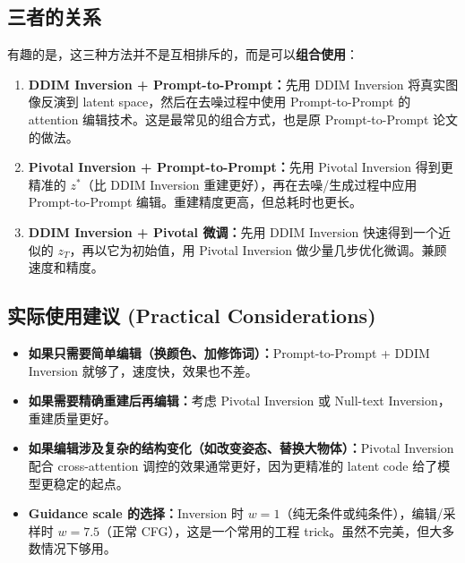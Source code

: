 \documentclass[11pt,a4paper]{article}
\theoremstyle{definition}
\begin{document}
\subsection{三者的关系}

有趣的是，这三种方法并不是互相排斥的，而是可以\textbf{组合使用}：

\begin{enumerate}
    \item \textbf{DDIM Inversion + Prompt-to-Prompt：}先用 DDIM Inversion 将真实图像反演到 latent space，然后在去噪过程中使用 Prompt-to-Prompt 的 attention 编辑技术。这是最常见的组合方式，也是原 Prompt-to-Prompt 论文的做法。

    \item \textbf{Pivotal Inversion + Prompt-to-Prompt：}先用 Pivotal Inversion 得到更精准的 $z^*$（比 DDIM Inversion 重建更好），再在去噪/生成过程中应用 Prompt-to-Prompt 编辑。重建精度更高，但总耗时也更长。

    \item \textbf{DDIM Inversion + Pivotal 微调：}先用 DDIM Inversion 快速得到一个近似的 $z_T$，再以它为初始值，用 Pivotal Inversion 做少量几步优化微调。兼顾速度和精度。
\end{enumerate}

\subsection{实际使用建议 (Practical Considerations)}

\begin{itemize}
    \item \textbf{如果只需要简单编辑（换颜色、加修饰词）：}Prompt-to-Prompt + DDIM Inversion 就够了，速度快，效果也不差。
    \item \textbf{如果需要精确重建后再编辑：}考虑 Pivotal Inversion 或 Null-text Inversion，重建质量更好。
    \item \textbf{如果编辑涉及复杂的结构变化（如改变姿态、替换大物体）：}Pivotal Inversion 配合 cross-attention 调控的效果通常更好，因为更精准的 latent code 给了模型更稳定的起点。
    \item \textbf{Guidance scale 的选择：}Inversion 时 $w=1$（纯无条件或纯条件），编辑/采样时 $w=7.5$（正常 CFG），这是一个常用的工程 trick。虽然不完美，但大多数情况下够用。
\end{itemize}


\end{document}
